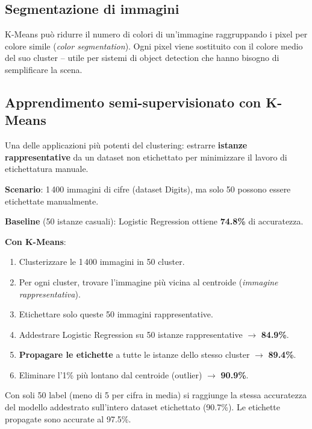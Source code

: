 \subsection{Segmentazione di immagini}

K-Means può ridurre il numero di colori di un'immagine raggruppando i pixel per colore simile (\emph{color segmentation}). Ogni pixel viene sostituito con il colore medio del suo cluster -- utile per sistemi di object detection che hanno bisogno di semplificare la scena.

\subsection{Apprendimento semi-supervisionato con K-Means}
Una delle applicazioni più potenti del clustering: estrarre \textbf{istanze rappresentative} da un dataset non etichettato per minimizzare il lavoro di etichettatura manuale.

\begin{exbox}
\textbf{Scenario}: 1\,400 immagini di cifre (dataset Digits), ma solo 50 possono essere etichettate manualmente.

\textbf{Baseline} (50 istanze casuali): Logistic Regression ottiene \textbf{74.8\%} di accuratezza.

\textbf{Con K-Means}:
\begin{enumerate}
    \item Clusterizzare le 1\,400 immagini in 50 cluster.
    \item Per ogni cluster, trovare l'immagine più vicina al centroide (\emph{immagine rappresentativa}).
    \item Etichettare solo queste 50 immagini rappresentative.
    \item Addestrare Logistic Regression su 50 istanze rappresentative $\to$ \textbf{84.9\%}.
    \item \textbf{Propagare le etichette} a tutte le istanze dello stesso cluster $\to$ \textbf{89.4\%}.
    \item Eliminare l'1\% più lontano dal centroide (outlier) $\to$ \textbf{90.9\%}.
\end{enumerate}

Con soli 50 label (meno di 5 per cifra in media) si raggiunge la stessa accuratezza del modello addestrato sull'intero dataset etichettato (90.7\%). Le etichette propagate sono accurate al 97.5\%.
\end{exbox}

